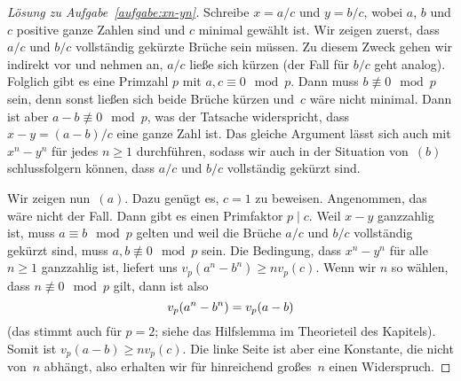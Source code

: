 \begin{proof}[Lösung zu Aufgabe~\ref{aufgabe:xn-yn}]
	Schreibe $x=a/c$ und $y=b/c$, wobei $a$, $b$ und $c$ positive ganze Zahlen sind und $c$ minimal gewählt ist. Wir zeigen zuerst, dass $a/c$ und $b/c$ vollständig gekürzte Brüche sein müssen. Zu diesem Zweck gehen wir indirekt vor und nehmen an, $a/c$ ließe sich kürzen (der Fall für $b/c$ geht analog). Folglich gibt es eine Primzahl $p$ mit $a,c\equiv 0\mod p$. Dann muss $b\not\equiv 0\mod p$ sein, denn sonst ließen sich beide Brüche kürzen und~$c$ wäre nicht minimal. Dann ist aber $a-b\not\equiv 0\mod p$, was der Tatsache widerspricht, dass $x-y=(a-b)/c$ eine ganze Zahl ist. Das gleiche Argument lässt sich auch mit $x^n-y^n$ für jedes $n\geqslant 1$ durchführen, sodass wir auch in der Situation von~$(b)$ schlussfolgern können, dass  $a/c$ und $b/c$ vollständig gekürzt sind.
	
	Wir zeigen nun~$(a)$. Dazu genügt es, $c=1$ zu beweisen. Angenommen, das wäre nicht der Fall. Dann gibt es einen Primfaktor $p\mid c$. Weil $x-y$ ganzzahlig ist, muss $a\equiv b\mod p$ gelten und weil die Brüche  $a/c$ und $b/c$ vollständig gekürzt sind, muss $a,b\not\equiv 0\mod p$ sein. Die Bedingung, dass $x^n-y^n$ für alle $n\geqslant 1$ ganzzahlig ist, liefert uns $v_p(a^n-b^n)\geqslant nv_p(c)$. Wenn wir $n$ so wählen, dass $n\not\equiv 0\mod p$ gilt, dann ist also
	\begin{equation*}
		v_p\parens*{a^n-b^n}=v_p(a-b)
	\end{equation*}
	(das stimmt auch für $p=2$; siehe das Hilfslemma im Theorieteil des Kapitels). Somit ist $v_p(a-b)\geqslant nv_p(c)$. Die linke Seite ist aber eine Konstante, die nicht von~$n$ abhängt, also erhalten wir für hinreichend großes~$n$ einen Widerspruch.
	

\end{proof}

